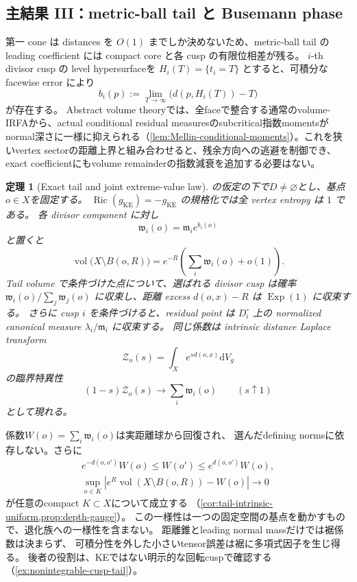 \documentclass[11pt,a4paper]{ltjsarticle}
\newcommand{\dd}{\mathrm d}
\newcommand{\Ric}{\operatorname{Ric}}
\newcommand{\vol}{\operatorname{vol}}
\theoremstyle{plain}
\newtheorem{theorem}{定理}[section]
\theoremstyle{definition}
\theoremstyle{remark}
\begin{document}
\subsection{主結果 III：metric-ball tail と Busemann phase}
第一 cone は distances を $O(1)$ までしか決めないため、metric-ball tail の leading coefficient には compact core と各 cusp の有限位相差が残る。
$i$-th divisor cusp の level hypersurfaceを $H_i(T)=\{t_i=T\}$ とすると、可積分な facewise error により
\[
 b_i(p):=\lim_{T\to\infty}\bigl(d(p,H_i(T))-T\bigr)
\]
が存在する。
Abstract volume theoryでは、全faceで整合する通常のvolume-IRFAから、actual conditional residual measuresのsubcritical指数momentsがnormal深さに一様に抑えられる（\cref{lem:Mellin-conditional-moments}）。これを狭いvertex sectorの距離上界と組み合わせると、残余方向への逃避を制御でき、exact coefficientにもvolume remainderの指数減衰を追加する必要はない。

\begin{theorem}[Exact tail and joint extreme-value law]
\label{thm:intro-tail}
の仮定の下で$D\ne\varnothing$とし、基点$o\in X$を固定する。
$\Ric(g_{\mathrm{KE}})=-g_{\mathrm{KE}}$ の規格化では全 vertex entropy は $1$ である。
各 divisor component に対し
\[
 \mathfrak w_i(o)=\mathfrak m_i e^{b_i(o)}
\]
と置くと
\begin{equation}
\label{eq:intro-exacttail}
 \boxed{
 \vol\bigl(X\setminus B(o,R)\bigr)
 =e^{-R}\left(\sum_i\mathfrak w_i(o)+o(1)\right).}
\end{equation}
Tail volume で条件づけた点について、選ばれる divisor cusp は確率
$\mathfrak w_i(o)/\sum_j\mathfrak w_j(o)$ に収束し、距離 excess $d(o,x)-R$ は $\operatorname{Exp}(1)$ に収束する。
さらに cusp $i$ を条件づけると、residual point は $D_i^\circ$ 上の normalized canonical measure $\lambda_i/\mathfrak m_i$ に収束する。
同じ係数は intrinsic distance Laplace transform
\[
 \mathcal Z_o(s)=\int_X e^{s d(o,x)}\dd V_g
\]
の臨界特異性
\[
 (1-s)\mathcal Z_o(s)\longrightarrow\sum_i\mathfrak w_i(o)
 \qquad(s\uparrow1)
\]
として現れる。
\end{theorem}

係数$W(o)=\sum_i\mathfrak w_i(o)$は実距離球から回復され、
選んだdefining normsに依存しない。さらに
\begin{gather*}
 e^{-d(o,o')}W(o)\le W(o')\le e^{d(o,o')}W(o),\\
 \sup_{o\in K}\left|e^R\vol(X\setminus B(o,R))-W(o)\right|\longrightarrow0
\end{gather*}
が任意のcompact $K\subset X$について成立する
（\cref{cor:tail-intrinsic-uniform,prop:depth-gauge}）。
この一様性は一つの固定空間の基点を動かすもので、退化族への一様性を含まない。
距離錐とleading normal massだけでは裾係数は決まらず、
可積分性を外した小さいtensor誤差は裾に多項式因子を生じ得る。
後者の役割は、KEではない明示的な回転cuspで確認する
（\cref{ex:nonintegrable-cusp-tail}）。
\end{document}

